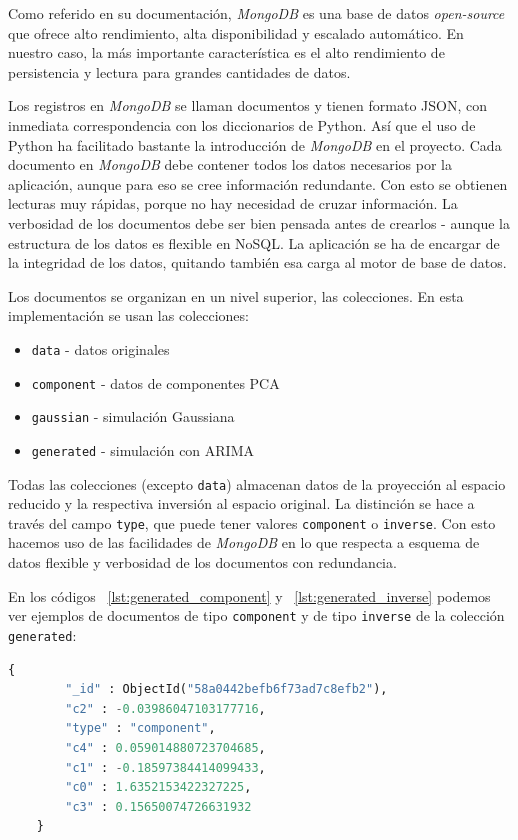 \documentclass[11pt,spanish,listoffigures,listoftables]{tfgetsinf}
\begin{document}
        Como referido en su documentación, {\em MongoDB} es una base de datos {\em open-source} que ofrece alto rendimiento, alta disponibilidad y escalado automático. En nuestro caso, la más importante característica es el alto rendimiento de persistencia y lectura para grandes cantidades de datos. 
        
        Los registros en {\em MongoDB} se llaman documentos y tienen formato JSON, con inmediata correspondencia con los diccionarios de Python. Así que el uso de Python ha facilitado bastante la introducción de {\em MongoDB} en el proyecto. Cada documento en {\em MongoDB} debe contener todos los datos necesarios por la aplicación, aunque para eso se cree información redundante. Con esto se obtienen lecturas muy rápidas, porque no hay necesidad de cruzar información. La verbosidad de los documentos debe ser bien pensada antes de crearlos - aunque la estructura de los datos es flexible en NoSQL. La aplicación se ha de encargar de la integridad de los datos, quitando también esa carga al motor de base de datos.
        
        Los documentos se organizan en un nivel superior, las colecciones. En esta implementación se usan las colecciones:
        \begin{itemize}
        \item {\tt data} - datos originales
        \item {\tt component} - datos de componentes PCA
        \item {\tt gaussian} - simulación Gaussiana
        \item {\tt generated} - simulación con ARIMA
        \end{itemize}
        
        Todas las colecciones (excepto {\tt data}) almacenan datos de la proyección al espacio reducido y la respectiva inversión al espacio original. La distinción se hace a través del campo {\tt type}, que puede tener valores {\tt component} o {\tt inverse}. Con esto hacemos uso de las facilidades de {\em MongoDB} en lo que respecta a esquema de datos flexible y verbosidad de los documentos con redundancia. 
        
        En los códigos ~\ref{lst:generated_component} y ~\ref{lst:generated_inverse} podemos ver ejemplos de documentos de tipo {\tt component} y de tipo {\tt inverse} de la colección {\tt generated}:
        \begin{lstlisting}[language=Python, caption=Documento de tipo {\tt component}., label={lst:generated_component}]
    {
        "_id" : ObjectId("58a0442befb6f73ad7c8efb2"),
        "c2" : -0.03986047103177716,
        "type" : "component",
        "c4" : 0.059014880723704685,
        "c1" : -0.18597384414099433,
        "c0" : 1.6352153422327225,
        "c3" : 0.15650074726631932
    }
        \end{lstlisting}
\end{document}
